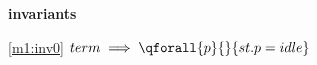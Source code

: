 \textbf{invariants}
\begin{block}
\item[ \eqref{m1:inv0} ]{$term \implies \qforall{p}{}{st.p = idle} $} %
\end{block}
